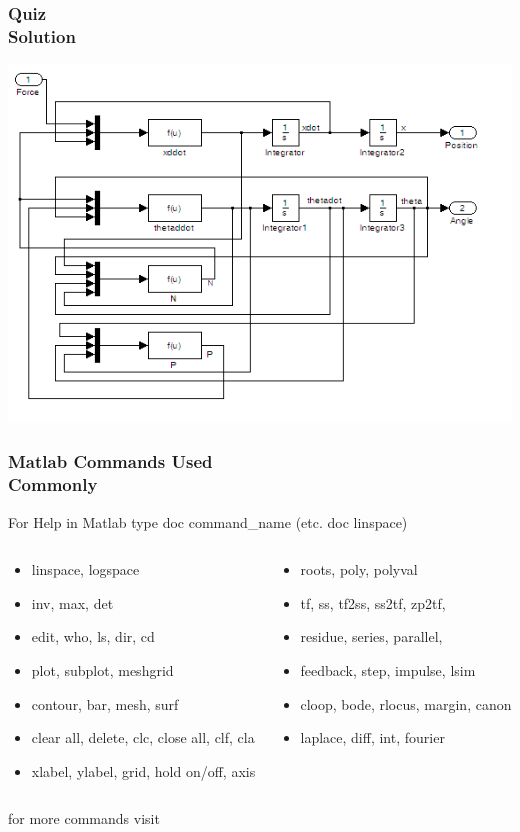 \documentclass[hyperref={pdfpagelabels=true}]{beamer}
\begin{document}
\begin{frame}
\frametitle{Quiz \\ Solution}
\centering
\includegraphics[scale = 0.7]{figs/Selection_046.png} \\
\end{frame}
\begin{frame}
\frametitle{Matlab Commands Used \\ Commonly}
For Help in Matlab type doc command\_name (etc.  doc linspace)
\begin{columns}
    \begin{column}{0.5\textwidth}

\begin{itemize}
\item linspace, logspace
\item inv, max, det
\item edit, who, ls, dir, cd
\item plot, subplot, meshgrid
\item contour, bar,  mesh, surf
\item clear all, delete, clc, close all, clf, cla
\item xlabel, ylabel, grid, hold on/off, axis
\end{itemize}

\end{column}

 \begin{column}{0.5\textwidth}
\begin{itemize}
\item roots, poly, polyval
\item tf, ss, tf2ss, ss2tf, zp2tf,
\item residue, series, parallel,
\item feedback, step, impulse, lsim
\item cloop, bode, rlocus, margin, canon
\item laplace, diff, int, fourier
\end{itemize}
\end{column}
\end{columns}
\noindent\makebox[\linewidth]{\rule{10 cm}{0.1pt}}
{\tiny for more commands visit}
\href{http://instruct.uwo.ca/engin-sc/391b/CTM/extras/commands.html}{}
\end{frame}
	
\end{document}
